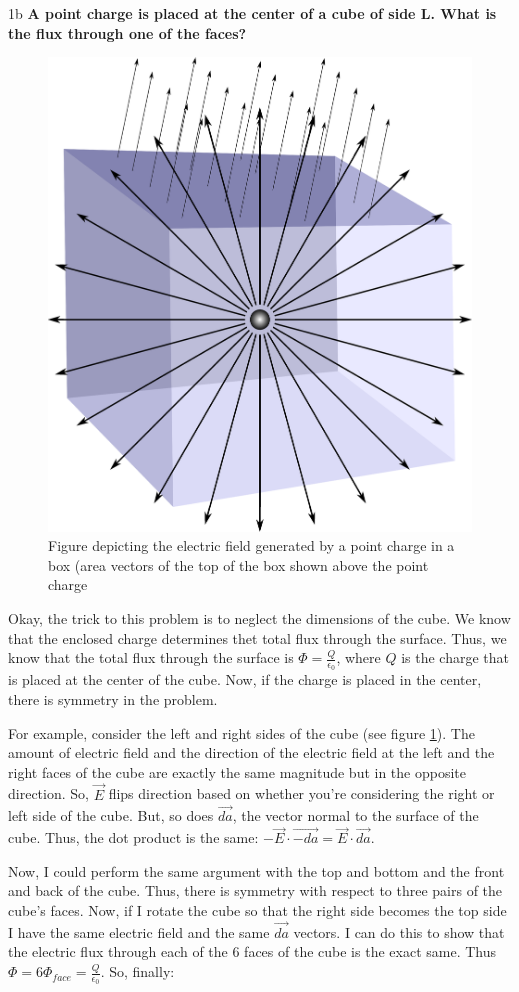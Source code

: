\begin{homeworkProblem}[Quiz 3, Pr. 1]
    \begin{homeworkSection}{1b}
        \textbf{A point charge is placed at the center of a cube of side
        L. What is the flux through one of the faces?}
        \\

        \begin{figure}[t]
            \centering
            \includegraphics[width=.4\textwidth]{./img/chargeinbox.eps}
            \caption{Figure depicting the electric field generated by a
            point charge in a box (area vectors of the top of the box
            shown above the point charge}
            \label{fig:chargeinbox.eps}
        \end{figure}

        Okay, the trick to this problem is to neglect the dimensions of
        the cube. We know that the enclosed charge determines thet total
        flux through the surface. Thus, we know that the total flux
        through the surface is $\Phi = \frac{Q}{\epsilon_0}$, where $Q$
        is the charge that is placed at the center of the cube. Now, if
        the charge is placed in the center, there is symmetry in the
        problem.
        
        For example, consider the left and right sides of the cube (see
        figure \ref{fig:chargeinbox.eps}). The amount of electric field
        and the direction of the electric field at the left and the
        right faces of the cube are exactly the same magnitude but in
        the opposite direction. So, $\vec{E}$ flips direction based on
        whether you're considering the right or left side of the cube.
        But, so does $\vec{da}$, the vector normal to the surface of the
        cube. Thus, the dot product is the same: $-\vec{E}\cdot\vec{-da}
        =\vec{E}\cdot\vec{da}$.

        Now, I could perform the same argument with the top and bottom
        and the front and back of the cube. Thus, there is symmetry with
        respect to three pairs of the cube's faces. Now, if I rotate the
        cube so that the right side becomes the top side I have the same
        electric field and the same $\vec{da}$ vectors. I can do this to
        show that the electric flux through each of the 6 faces of the
        cube is the exact same. Thus $\Phi = 6\Phi_{face} =
        \frac{Q}{\epsilon_0}$. So, finally:


\end{homeworkSection}
\end{homeworkProblem}
